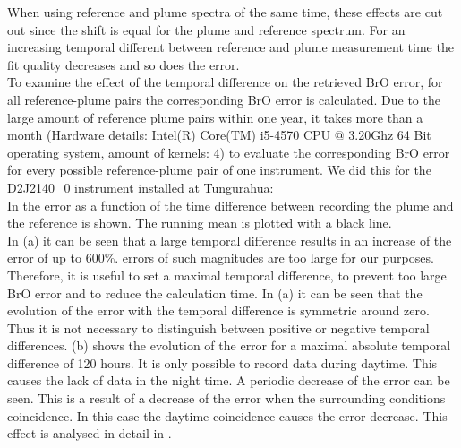 When using reference and plume spectra of the same time, these effects are cut out since the shift is equal for the plume and reference spectrum.
For an increasing temporal different between reference and plume measurement time the fit quality decreases and so does the  error.\\
To examine the effect of the temporal difference on the retrieved BrO error, for all reference-plume pairs the corresponding BrO error is calculated. Due to the large amount of reference plume pairs within one year, it takes more than a month (Hardware details: Intel(R) Core(TM) i5-4570 CPU @ 3.20Ghz 64 Bit operating system, amount of kernels: 4) to evaluate the corresponding BrO error for every possible reference-plume pair of one instrument. We did this for the  D2J2140\_0 instrument installed at Tungurahua:\\
In  the  error as a function of the time difference between recording the plume and the reference is shown. The running mean is plotted with a black line. \\
In  (a) it can be seen that a large temporal difference results in an increase of the   error of up to 600\%.  errors of such magnitudes are too large for our purposes. Therefore, it is useful to set a maximal temporal difference, to prevent too large BrO error and to reduce the calculation time.
%
In  (a) it can be seen that the evolution of the   error with the temporal difference is symmetric around zero. Thus it is not necessary to distinguish between positive or negative temporal differences.
%
 (b) shows the evolution of the  error for a maximal absolute temporal difference of 120 hours. It is only possible to record data during daytime. This causes the lack of data in the night time. A periodic decrease of the  error can be seen. This is a result of a decrease of the  error when the surrounding conditions coincidence. In this case the daytime coincidence causes the   error decrease. This effect is analysed in detail in .\\

